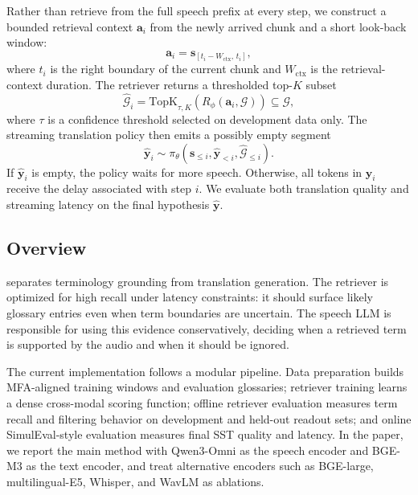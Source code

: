 Rather than retrieve from the full speech prefix at every step, we construct a bounded retrieval context $\mathbf{a}_i$ from the newly arrived chunk and a short look-back window:
\begin{equation}
  \mathbf{a}_i = \mathbf{s}_{[t_i-W_{\mathrm{ctx}},\,t_i]},
\end{equation}
where $t_i$ is the right boundary of the current chunk and $W_{\mathrm{ctx}}$ is the retrieval-context duration.  The retriever returns a thresholded top-$K$ subset
\begin{equation}
  \hat{\mathcal{G}}_i =
  \mathrm{TopK}_{\tau,K}\left(R_\phi(\mathbf{a}_i,\mathcal{G})\right)
  \subseteq \mathcal{G},
\end{equation}
where $\tau$ is a confidence threshold selected on development data only.  The streaming translation policy then emits a possibly empty segment
\begin{equation}
  \hat{\mathbf{y}}_i \sim
  \pi_\theta(\mathbf{s}_{\le i}, \hat{\mathbf{y}}_{<i}, \hat{\mathcal{G}}_{\le i}).
\end{equation}
If $\hat{\mathbf{y}}_i$ is empty, the policy waits for more speech.  Otherwise, all tokens in $\hat{\mathbf{y}}_i$ receive the delay associated with step $i$.  We evaluate both translation quality and streaming latency on the final hypothesis $\hat{\mathbf{y}}$.

\subsection{\method Overview}
\label{sec:method_overview}

\method separates terminology grounding from translation generation.  The retriever is optimized for high recall under latency constraints: it should surface likely glossary entries even when term boundaries are uncertain.  The speech LLM is responsible for using this evidence conservatively, deciding when a retrieved term is supported by the audio and when it should be ignored.

The current implementation follows a modular pipeline.  Data preparation builds MFA-aligned training windows and evaluation glossaries; retriever training learns a dense cross-modal scoring function; offline retriever evaluation measures term recall and filtering behavior on development and held-out readout sets; and online SimulEval-style evaluation measures final SST quality and latency.  In the paper, we report the main method with Qwen3-Omni as the speech encoder and BGE-M3 as the text encoder, and treat alternative encoders such as BGE-large, multilingual-E5, Whisper, and WavLM as ablations.

